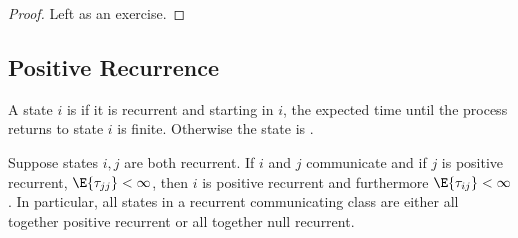 \documentclass[12pt]{article}
\begin{document}
\begin{proof}
    Left as an exercise.
\end{proof}

\subsection*{Positive Recurrence}

\begin{definition}
    A state \( i \) is  if it is recurrent and
    starting in \( i \), the expected time until the process returns to
    state \( i \) is finite.  Otherwise the state is .
\end{definition}

\begin{proposition}
    Suppose states \( i,j \) are both recurrent.  If \( i \) and \( j \)
    communicate and if \( j \) is positive recurrent, \( \E{\tau_{jj}} <
    \infty \), then \( i \) is positive recurrent and furthermore \( \E{\tau_
    {ij}} < \infty \).  In particular, all states in a recurrent
    communicating class are either all together positive recurrent or
    all together null recurrent.
\end{proposition}
\end{document}
